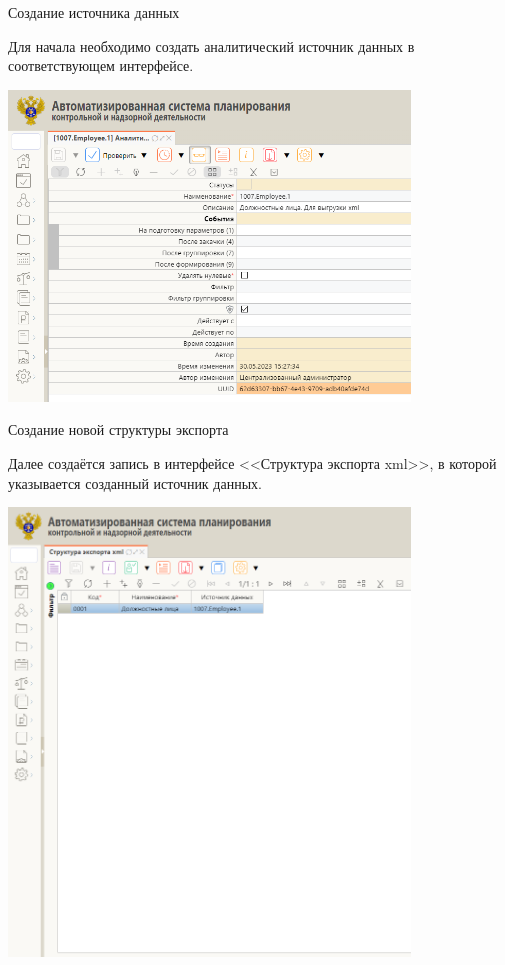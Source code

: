 \documentclass[fullscreen=true,russian,compress,%
	hyperref={unicode,bookmarks=false}]{presentation}
\begin{document}
\begin{frame}{Создание источника данных}

Для начала необходимо создать аналитический источник данных в соответствующем интерфейсе.
\hfill
\centerline{\includegraphics[width=0.8\textwidth]{imgs/source.png}}

\end{frame}

\begin{frame}{Создание новой структуры экспорта}

Далее создаётся запись в интерфейсе <<Структура экспорта xml>>, в которой указывается созданный источник данных.
\hfill
\centerline{\includegraphics[width=0.8\textwidth]{imgs/main.png}}

\end{frame}
\end{document}
